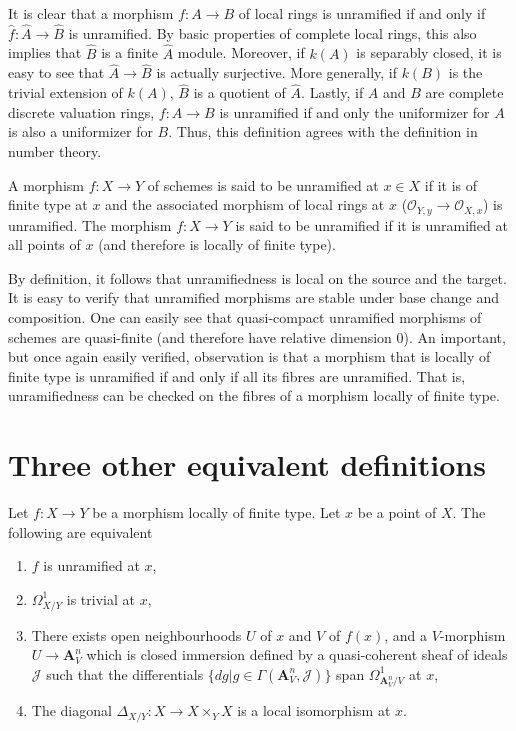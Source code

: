 \noindent
It is clear that a morphism $f:A \to B$ of local rings is unramified if and
only if $\widehat{f}:\widehat{A} \to \widehat{B}$ is unramified. By basic
properties of complete local rings, this also implies that $\widehat{B}$ is a
finite $\widehat{A}$ module. Moreover, if $k(A)$ is separably closed, it is
easy to see that $\widehat{A} \to \widehat{B}$ is actually surjective. More
generally, if $k(B)$ is the trivial extension of $k(A)$, $\widehat{B}$ is a
quotient of $\widehat{A}$. Lastly, if $A$ and $B$ are complete discrete
valuation rings, $f:A \to B$ is unramified if and only the uniformizer for
$A$ is also a uniformizer for $B$. Thus, this definition agrees with the
definition in number theory.

\begin{definition}
\label{definition-unramified-schemes}
A morphism $f:X \to Y$ of schemes is said to be unramified at $x \in X$ if it
is of finite type at $x$ and the associated morphism of local rings at $x$
($\mathcal{O}_{Y,y} \to \mathcal{O}_{X,x}$) is unramified. The morphism $f:X 
\to Y$ is said to
be unramified if it is unramified at all points of $x$ (and therefore is
locally of finite type).
\end{definition}

\noindent
By definition, it follows that unramifiedness is local on the source and the
target. It is easy to verify that unramified morphisms are stable under
base change and composition. One can easily see that quasi-compact unramified
morphisms of schemes are quasi-finite (and therefore have relative dimension
$0$). An important, but once again easily verified, observation is that a
morphism that is locally of finite type is unramified if and only if all its
fibres are unramified. That is, unramifiedness can be checked on the fibres
of a morphism locally of finite type.

\section{Three other equivalent definitions}
\label{section-three-other}

\begin{theorem}
\label{theorem-unramified-equivalence}
Let $f:X \to Y$ be a morphism locally of finite type. Let $x$ be a point of
$X$. The following are equivalent
\begin{enumerate}
\item $f$ is unramified at $x$,
\item $\Omega^1_{X/Y}$ is trivial at $x$,
\item There exists open neighbourhoods $U$ of $x$ and $V$ of $f(x)$, and a
$V$-morphism $U \to \mathbf{A}^n_V$ which is closed immersion defined by a
quasi-coherent sheaf of ideals $\mathcal{J}$ such that the differentials
$\{dg | g \in \Gamma(\mathbf{A}^n_V,\mathcal{J})\}$ span 
$\Omega^1_{\mathbf{A}^n_V/V}$ at $x$,
\item The diagonal $\Delta_{X/Y}:X \to X \times_Y X$ is a local isomorphism at
$x$.
\end{enumerate}
\end{theorem}

